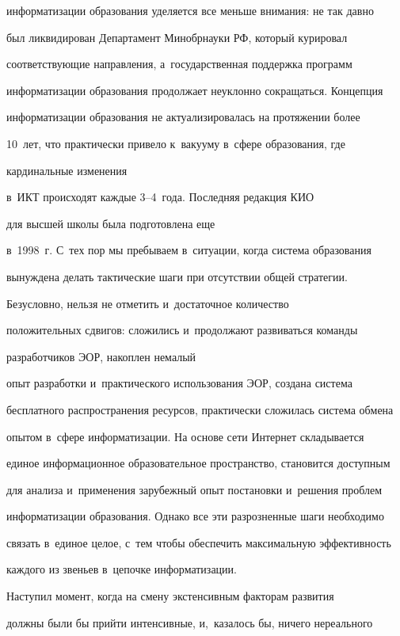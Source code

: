 информатизации образования уделяется все меньше внимания: не так давно


был ликвидирован Департамент Минобрнауки РФ, который курировал


соответствующие на\-прав\-ле\-ния, а~государственная поддержка программ


информатизации образования продолжает неуклонно сокращаться. Концепция


информатизации образования не актуализировалась на протяжении более


10~лет, что практически привело к~вакууму в~сфере образования, где


кардинальные изменения


в~ИКТ происходят каждые 3--4~года. Последняя редакция КИО


 для высшей школы была подготовлена еще


в~1998~г. С~тех пор мы пребываем в~ситуации, когда система образования


вынуждена делать тактические шаги при отсутствии общей стратегии.





     Безусловно, нельзя не отметить и~достаточное количество


положительных сдвигов: сложились и~продолжают развиваться команды


разработчиков ЭОР, накоплен немалый


опыт разработки и~практического использования ЭОР, создана система


бесплатного распространения ресурсов, практически сложилась система обмена


опытом в~сфере информатизации. На основе сети Интернет складывается


единое информационное образовательное пространство, становится доступным


для анализа и~применения зарубежный опыт постановки и~решения проб\-лем


информатизации образования. Однако все эти разрозненные шаги необходимо


связать в~единое целое, с~тем чтобы обеспечить максимальную эффективность


каждого из звеньев в~цепочке информатизации.





     Наступил момент, когда на смену экстенсивным факторам развития


должны были бы прийти интенсивные, и,~казалось бы, ничего нереального


